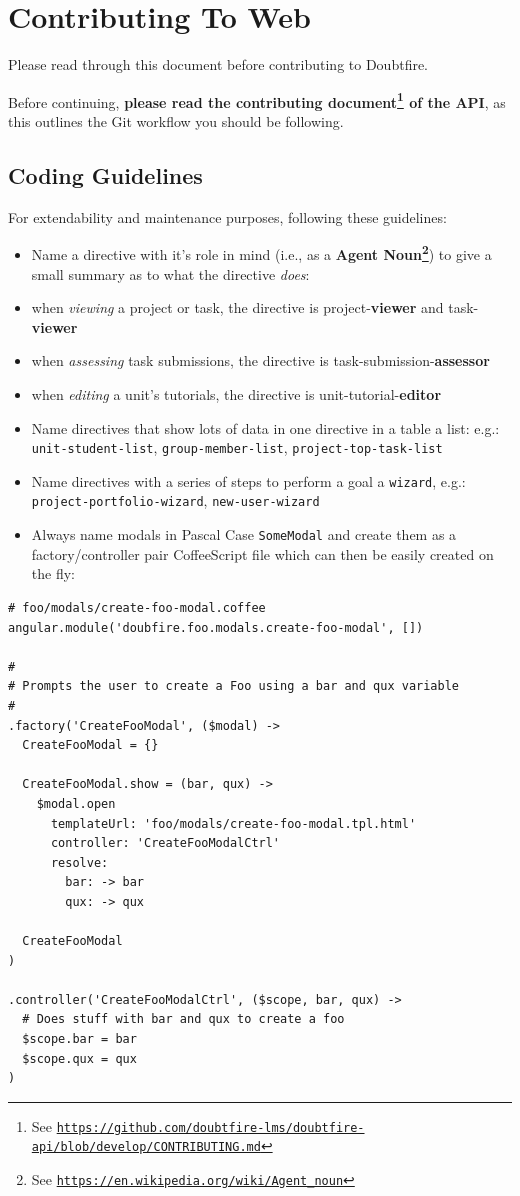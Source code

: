 \documentclass[12pt,a4paper,]{article}
\renewcommand{\href}[2]{#2\footnote{See \texttt{\url{#1}}}}
\providecommand{\tightlist}{%
  \setlength{\itemsep}{0pt}\setlength{\parskip}{0pt}}
\begin{document}
\section{Contributing To Web}\label{contributing}

Please read through this document before contributing to Doubtfire.

Before continuing, \textbf{please read the
\href{https://github.com/doubtfire-lms/doubtfire-api/blob/develop/CONTRIBUTING.md}{contributing
document} of the API}, as this outlines the Git workflow you should be
following.

\subsection{Coding Guidelines}\label{coding-guidelines}

For extendability and maintenance purposes, following these guidelines:

\begin{itemize}
\tightlist
\item
  Name a directive with it's role in mind (i.e., as a
  \textbf{\href{https://en.wikipedia.org/wiki/Agent_noun}{Agent Noun}})
  to give a small summary as to what the directive \emph{does}:
\item
  when \emph{viewing} a project or task, the directive is
  project-\textbf{viewer} and task-\textbf{viewer}
\item
  when \emph{assessing} task submissions, the directive is
  task-submission-\textbf{assessor}
\item
  when \emph{editing} a unit's tutorials, the directive is
  unit-tutorial-\textbf{editor}
\item
  Name directives that show lots of data in one directive in a table a
  list: e.g.: \texttt{unit-student-list}, \texttt{group-member-list},
  \texttt{project-top-task-list}
\item
  Name directives with a series of steps to perform a goal a
  \texttt{wizard}, e.g.: \texttt{project-portfolio-wizard},
  \texttt{new-user-wizard}
\item
  Always name modals in Pascal Case \texttt{SomeModal} and create them
  as a factory/controller pair CoffeeScript file which can then be
  easily created on the fly:
\end{itemize}

\begin{verbatim}
# foo/modals/create-foo-modal.coffee
angular.module('doubfire.foo.modals.create-foo-modal', [])

#
# Prompts the user to create a Foo using a bar and qux variable
#
.factory('CreateFooModal', ($modal) ->
  CreateFooModal = {}

  CreateFooModal.show = (bar, qux) ->
    $modal.open
      templateUrl: 'foo/modals/create-foo-modal.tpl.html'
      controller: 'CreateFooModalCtrl'
      resolve:
        bar: -> bar
        qux: -> qux

  CreateFooModal
)

.controller('CreateFooModalCtrl', ($scope, bar, qux) ->
  # Does stuff with bar and qux to create a foo
  $scope.bar = bar
  $scope.qux = qux
)
\end{verbatim}
\end{document}
